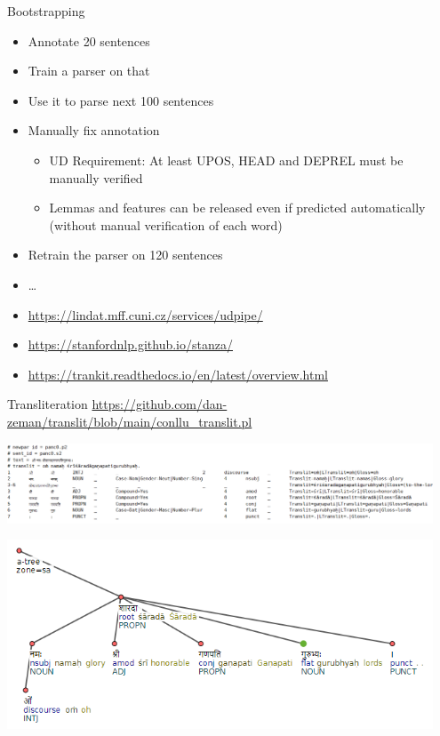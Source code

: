 \documentclass[10pt, compress, aspectratio=169]{beamer}
\begin{document}
\begin{frame}{Bootstrapping}
  \begin{itemize}
    \item<1-> Annotate 20 sentences
    \item<2-> Train a parser on that
    \item<3-> Use it to parse next 100 sentences
    \item<4-> Manually fix annotation
      \begin{itemize}
        \item \alert{UD Requirement: At least UPOS, HEAD and DEPREL must
            be manually verified}
        \item Lemmas and features can be released even if predicted
            automatically (without manual verification of each word)
      \end{itemize}
    \item<5-> Retrain the parser on 120 sentences
    \item<5-> \dots{}
    \bigskip
    \item \url{https://lindat.mff.cuni.cz/services/udpipe/}
    \item \url{https://stanfordnlp.github.io/stanza/}
    \item \url{https://trankit.readthedocs.io/en/latest/overview.html}
  \end{itemize}
\end{frame}


\begin{frame}{Transliteration}
  \url{https://github.com/dan-zeman/translit/blob/main/conllu_translit.pl}

  \includegraphics[width=0.95\textwidth]{images/translit-conllu.png}

  \includegraphics[width=0.95\textwidth]{images/translit-pmltq.png}
\end{frame}
\end{document}
